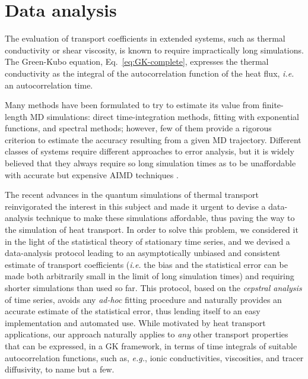 \chapter{Data analysis}  \label{ch:data-analysis}

\begin{LEtext}
The evaluation of transport coefficients in extended systems, such as thermal conductivity or shear viscosity, is known to require impractically long simulations. The Green-Kubo equation, Eq.~\eqref{eq:GK-complete}, expresses the thermal conductivity as the integral of the autocorrelation function of the heat flux, \emph{i.e.} an autocorrelation time. 

Many methods have been formulated to try to estimate its value from finite-length MD simulations: direct time-integration methods, fitting with exponential functions, and spectral methods; however, few of them provide a rigorous criterion to estimate the accuracy resulting from a given MD trajectory. Different classes of systems require different approaches to error analysis, but it is widely believed that they always require so long simulation times as to be unaffordable with accurate but expensive AIMD techniques \citep{Carbogno:2017gc}. 

The recent advances in the quantum simulations of thermal transport reinvigorated the interest in this subject and made it urgent to devise a data-analysis technique to make these simulations affordable, thus paving the way to the \abinitio simulation of heat transport.
In order to solve this problem, we considered it in the light of the statistical theory of stationary time series, and we devised a data-analysis protocol leading to an asymptotically unbiased and consistent estimate of transport coefficients (\emph{i.e.} the bias and the statistical error can be made both arbitrarily small in the limit of long simulation times) and requiring shorter simulations than used so far. This protocol, based on the \emph{cepstral analysis} of time series, avoids any \emph{ad-hoc} fitting procedure and naturally provides an accurate estimate of the statistical error, thus lending itself to an easy implementation and automated use. 
While motivated by heat transport applications, our approach naturally applies to \emph{any} other transport properties that can be expressed, in a GK framework, in terms of time integrals of suitable autocorrelation functions, such as, \emph{e.g.}, ionic conductivities, viscosities, and tracer diffusivity, to name but a few. 


\end{LEtext}
